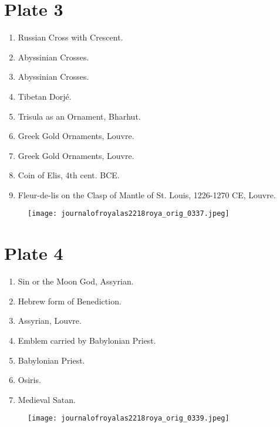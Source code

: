 \documentclass[a4paper, 11pt, oneside, english]{article}
\begin{document}
\section*{Plate 3}
\begin{enumerate}
    \item Russian Cross with Crescent.

    \item Abyssinian Crosses.

    \item Abyssinian Crosses.

    \item Tibetan Dorjé.

    \item Trisula as an Ornament, Bharhut.

    \item Greek Gold Ornaments, Louvre.

    \item Greek Gold Ornaments, Louvre.

    \item Coin of Elis, 4th cent. BCE.

    \item Fleur-de-lis on the Clasp of Mantle of St. Louis, 1226-1270 CE, Louvre.
\end{enumerate}
\vspace*{\fill}  
\clearpage
\clearpage
\vspace*{\fill}  
\begin{figure}[H]
\centering
\texttt{[image: journalofroyalas2218roya\_orig\_0337.jpeg]}
\end{figure}
\vspace*{\fill} 
\clearpage
\vspace*{\fill}  
\section*{Plate 4}
\begin{enumerate}
    \item Sin or the Moon God, Assyrian.

    \item Hebrew form of Benediction.

    \item Assyrian, Louvre.

    \item Emblem carried by Babylonian Priest.

    \item Babylonian Priest.

    \item Osiris.

    \item Medieval Satan.
\end{enumerate}
\vspace*{\fill}  
\clearpage
\clearpage
\vspace*{\fill}  
\begin{figure}[H]
\centering
\texttt{[image: journalofroyalas2218roya\_orig\_0339.jpeg]}
\end{figure}
\vspace*{\fill} 
\clearpage
\vspace*{\fill}  
\end{document}
